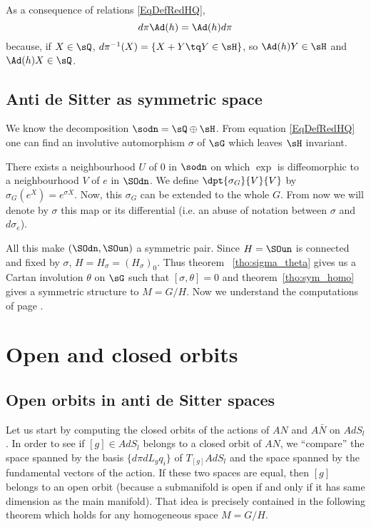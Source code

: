 As a consequence of relations \eqref{EqDefRedHQ},
\begin{equation}  \label{EqdpiAdpi}
	d\pi\Ad(h)=\Ad(h) d\pi
\end{equation}
because, if $X\in\sQ$, $d\pi^{-1}(X)=\{ X+Y\tq Y\in\sH \}$, so $\Ad(h)Y\in\sH$ and $\Ad(h)X\in \sQ$.

\subsection{Anti de Sitter as symmetric space}
\label{pg:AdS_n_syme}

We know the decomposition $\sodn=\sQ\oplus\sH$. From equation \eqref{EqDefRedHQ} one can find an involutive automorphism $\sigma$ of $\sG$ which leaves $\sH$ invariant.

There exists a neighbourhood $U$ of $0$ in $\sodn$ on which $\exp$ is diffeomorphic to a neighbourhood $V$ of $e$ in $\SOdn$. We define $\dpt{\sigma_G}{V}{V}$ by $\sigma_G(e^X)=e^{\sigma X}$. Now, this $\sigma_G$ can be extended to the whole $G$. From now we will denote by $\sigma$ this map or its differential (i.e. an abuse of notation between $\sigma$ and $d\sigma_e$).

All this make $(\SOdn,\SOun)$ a symmetric pair. Since $H=\SOun$ is connected and fixed by $\sigma$, $H=H_{\sigma}=(H_{\sigma})_0$. Thus theorem ~\ref{tho:sigma_theta} gives us a Cartan involution $\theta$ on $\sG$ such that $[\sigma,\theta]=0$ and theorem~\ref{tho:sym_homo} gives a symmetric structure to $M=G/H$. Now we understand the computations of page \pageref{pg:calcul_sigma_theta}.

\section{Open and closed orbits}

\subsection{Open orbits in anti de Sitter spaces}

Let us start by computing the closed orbits of the actions of $AN$ and $A\bar{N}$ on $AdS_l$. In order to see if $[g]\in AdS_l$ belongs to a closed orbit of $AN$, we ``compare'' the space spanned by the basis $\{d\pi dL_g q_i\}$ of $T_{[g]}AdS_l$ and the space spanned by the fundamental vectors of the action. If these two spaces are equal, then $[g]$ belongs to an open orbit (because a submanifold is open if and only if it has same dimension as the main manifold). That idea is precisely contained in the following theorem which holds for any homogeneous space $M=G/H$.

